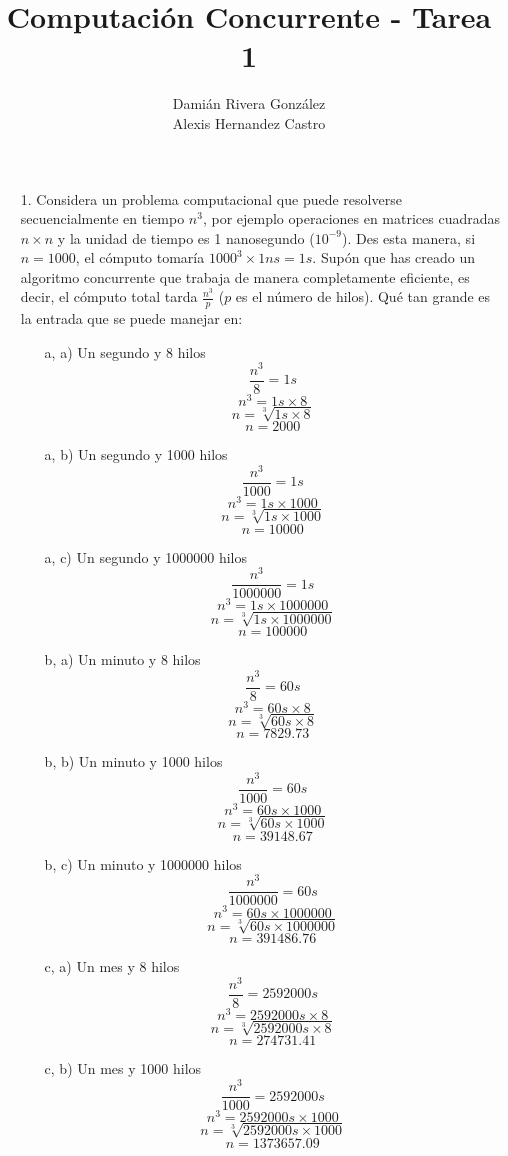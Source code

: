 \documentclass[12pt, letterpaper]{article}
\title{Computación Concurrente - Tarea 1}
\author{Damián Rivera González\\Alexis Hernandez Castro}
\begin{document}
\maketitle
\begin{itemize}
\item[1. ] Considera un problema computacional que puede resolverse secuencialmente en tiempo $n^3$, por ejemplo operaciones en matrices cuadradas $n\times n$ y la unidad de tiempo es 1 nanosegundo ($10^{-9}$). Des esta manera, si $n = 1000$, el cómputo tomaría $1000^3 \times 1 ns = 1s$. Supón que has creado un algoritmo concurrente que trabaja de manera completamente eficiente, es decir, el cómputo total tarda $\frac{n^3}{p}$ ($p$ es el número de hilos). Qué tan grande es la entrada que se puede manejar en: 

\begin{itemize}
\item[a, a) ] Un segundo y 8 hilos
$$\frac{n^3}{8} = 1s$$
$$n^3 = 1s \times 8$$
$$n = \sqrt[3]{1s \times 8}$$
$$n = 2000$$

\item[a, b) ] Un segundo y 1000 hilos
$$\frac{n^3}{1000} = 1s$$
$$n^3 = 1s \times 1000$$
$$n = \sqrt[3]{1s \times 1000}$$
$$n = 10000$$

\item[a, c) ] Un segundo y 1000000 hilos
$$\frac{n^3}{1000000} = 1s$$
$$n^3 = 1s \times 1000000$$
$$n = \sqrt[3]{1s \times 1000000}$$
$$n = 100000$$

\item[b, a) ] Un minuto y 8 hilos
$$\frac{n^3}{8} = 60s$$
$$n^3 = 60s \times 8$$
$$n = \sqrt[3]{60s \times 8}$$
$$n = 7829.73$$

\item[b, b) ] Un minuto y 1000 hilos
$$\frac{n^3}{1000} = 60s$$
$$n^3 = 60s \times 1000$$
$$n = \sqrt[3]{60s \times 1000}$$
$$n = 39148.67$$

\item[b, c) ] Un minuto y 1000000 hilos
$$\frac{n^3}{1000000} = 60s$$
$$n^3 = 60s \times 1000000$$
$$n = \sqrt[3]{60s \times 1000000}$$
$$n = 391486.76$$

\item[c, a) ] Un mes y 8 hilos
$$\frac{n^3}{8} = 2592000s$$
$$n^3 = 2592000s \times 8$$
$$n = \sqrt[3]{2592000s \times 8}$$
$$n = 274731.41$$

\item[c, b) ] Un mes y 1000 hilos
$$\frac{n^3}{1000} = 2592000s$$
$$n^3 = 2592000s \times 1000$$
$$n = \sqrt[3]{2592000s \times 1000}$$
$$n = 1373657.09$$


\end{itemize}
\end{itemize}
\end{document}
